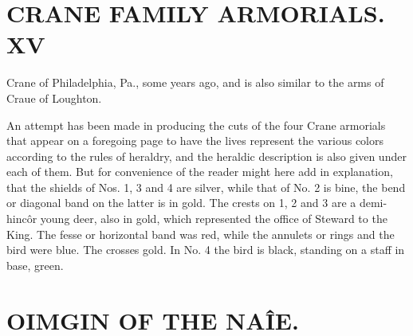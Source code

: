 \documentclass{book}
\begin{document}
\chapter{CRANE FAMILY ARMORIALS. XV}
Crane of Philadelphia, Pa., some years ago, and is also similar 
to the arms of Craue of Loughton. 

An attempt has been made in producing the cuts of the four 
Crane armorials that appear on a foregoing page to have the lives 
represent the various colors according to the rules of heraldry, 
and the heraldic description is also given under each of them. 
But for convenience of the reader might here add in explanation, 
that the shields of Nos. 1, 3 and 4 are silver, while that of No. 
2 is bine, the bend or diagonal band on the latter is in gold. 
The crests on 1, 2 and 3 are a demi-hinc\^ or young deer, also in 
gold, which represented the office of Steward to the King. The 
fesse or horizontal band was red, while the annulets or rings and 
the bird were blue. The crosses gold. In No. 4 the bird is 
black, standing on a staff in base, green. 



\chapter{OIMGIN OF THE NA\^IE.}
\end{document}

